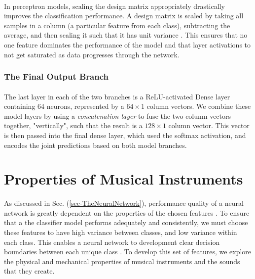 \documentclass[12pt,letterpaper]{article}
\begin{document}
\paragraph*{}In perceptron models, scaling the design matrix appropriately drastically improves the classification performance. A design matrix is scaled by taking all samples in a column (a particular feature from each class), subtracting the average, and then scaling it such that it has unit variance \cite{Geron,James}. This ensures that no one feature dominates the performance of the model and that layer activations to not get saturated as data progresses through the network.


\subsubsection{The Final Output Branch}

\paragraph*{}The last layer in each of the two branches is a ReLU-activated Dense layer containing 64 neurons, represented by a $64 \times 1$ column vectors. We combine these model layers by using a \textit{concatenation layer} to fuse the two column vectors together, "vertically", such that the result is a $128 \times 1$ column vector. This vector is then passed into the final dense layer, which used the softmax activation, and encodes the joint predictions based on both model branches. 


\newpage
\section{Properties of Musical Instruments}
\label{sec-Instruments}

\paragraph*{}As discussed in Sec. (\ref{sec-TheNeuralNetwork}), performance quality of a neural network is greatly dependent on the properties of the chosen features \cite{Virtanen,Liu}. To ensure that a the classifier model performs adequately and consistently, we must choose these features to have high variance between classes, and low variance within each class. This enables a neural network to development clear decision boundaries between each unique class \cite{James,Serizel}. To develop this set of features, we explore the physical and mechanical properties of musical instruments and the sounds that they create.
\end{document}
